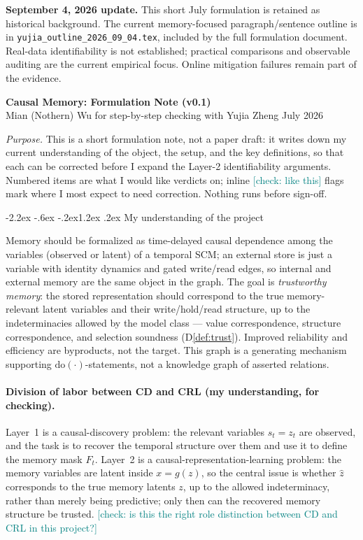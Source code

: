 \documentclass[10pt]{article}
\makeatletter
\newcommand{\Do}{\mathrm{do}}
\newcommand{\checkY}[1]{\textcolor{teal}{\footnotesize [check: #1]}}
\renewcommand\section{\@startsection{section}{1}{\z@}%
  {-2.2ex \@plus -.6ex \@minus -.2ex}{1.2ex \@plus .2ex}%
  {\normalfont\large\bfseries}}
\theoremstyle{plain}
\theoremstyle{definition}
\makeatother
\begin{document}
\noindent\textbf{September 4, 2026 update.} This short July formulation is retained
as historical background. The current memory-focused paragraph/sentence outline
is in \texttt{yujia\_outline\_2026\_09\_04.tex}, included by the full formulation
document. Real-data identifiability is not established; practical comparisons and
observable auditing are the current empirical focus. Online mitigation failures
remain part of the evidence.
\begin{center}
{\LARGE\bfseries Causal Memory: Formulation Note (v0.1)}\\[3pt]
{\small Mian (Nothern) Wu \;\textperiodcentered\; for step-by-step checking with Yujia Zheng \;\textperiodcentered\; July 2026}
\end{center}
\vspace{2pt}

\noindent\emph{Purpose.} This is a short formulation note, not a paper draft: it writes down my current understanding of the object, the setup, and the key definitions, so that each can be corrected before I expand the Layer-2 identifiability arguments. Numbered items are what I would like verdicts on; inline \checkY{like this} flags mark where I most expect to need correction. Nothing runs before sign-off.

\section{My understanding of the project}\label{sec:thesis}

Memory should be formalized as time-delayed causal dependence among the variables (observed or latent) of a temporal SCM; an external store is just a variable with identity dynamics and gated write/read edges, so internal and external memory are the same object in the graph. The goal is \emph{trustworthy memory}: the stored representation should correspond to the true memory-relevant latent variables and their write/hold/read structure, up to the indeterminacies allowed by the model class --- value correspondence, structure correspondence, and selection soundness (D\ref{def:trust}). Improved reliability and efficiency are byproducts, not the target. This graph is a generating mechanism supporting $\Do(\cdot)$-statements, not a knowledge graph of asserted relations.

\paragraph{Division of labor between CD and CRL (my understanding, for checking).}
Layer~1 is a causal-discovery problem: the relevant variables $s_t = z_t$ are observed, and the task is to recover the temporal structure over them and use it to define the memory mask $F_t$. Layer~2 is a causal-representation-learning problem: the memory variables are latent inside $x = g(z)$, so the central issue is whether $\hat z$ corresponds to the true memory latents $z$, up to the allowed indeterminacy, rather than merely being predictive; only then can the recovered memory structure be trusted. \checkY{is this the right role distinction between CD and CRL in this project?}
\end{document}
